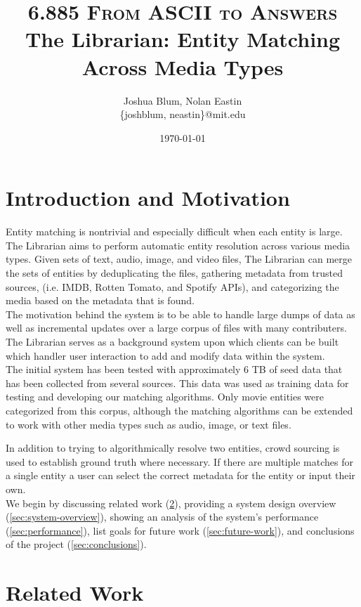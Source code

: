 \documentclass[paper=a4, fontsize=11pt]{scrartcl} %
\title{ 
\normalfont \normalsize 
\textsc{6.885 From ASCII to Answers} %
\horrule{0.5pt} %
\large The Librarian: Entity Matching Across Media Types %
\horrule{1pt} %
}
\author{Joshua Blum, Nolan Eastin \\ \{joshblum, neastin\}@mit.edu}
\date{\normalsize\today} %
\numberwithin{equation}{section} %
\numberwithin{figure}{section} %
\numberwithin{table}{section} %
\begin{document}
\maketitle %

\section{Introduction and Motivation}
Entity matching is nontrivial and especially difficult when each entity is large. The Librarian aims to perform automatic entity resolution across various media types. Given sets of text, audio, image, and video files, The Librarian can merge the sets of entities by deduplicating the files, gathering metadata from trusted sources, (i.e. IMDB, Rotten Tomato, and Spotify APIs), and categorizing the media based on the metadata that is found. \\

The motivation behind the system is to be able to handle large dumps of data as well as incremental updates over a large corpus of files with many contributers. The Librarian serves as a background system upon which clients can be built which handler user interaction to add and modify data within the system.\\

The initial system has been tested with approximately 6 TB of seed data that has been collected from several sources. This data was used as training data for testing and developing our matching algorithms. Only movie entities were categorized from this corpus, although the matching algorithms can be extended to work with other media types such as audio, image, or text files.

In addition to trying to algorithmically resolve two entities, crowd sourcing is used to establish ground truth where necessary. If there are multiple matches for a single entity a user can select the correct metadata for the entity or input their own.\\

We begin by discussing related work (\ref{sec:related-work}), providing a system design overview (\ref{sec:system-overview}), showing an analysis of the system's performance (\ref{sec:performance}), list goals for future work (\ref{sec:future-work}), and conclusions of the project (\ref{sec:conclusions}).

\section{Related Work}
\label{sec:related-work}
\end{document}
